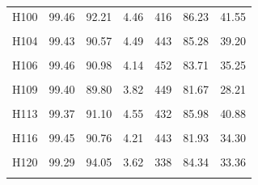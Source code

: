 \documentclass[
  a4paper,
  titlepage]{article}
\begin{document}
\begin{longtable}[t]{lllllll}
H100 & 99.46 & 92.21 & 4.46 & 416 & 86.23 & 41.55\\
 
\cellcolor{gray!6}{H102} & \cellcolor{gray!6}{99.46} & \cellcolor{gray!6}{91.46} & \cellcolor{gray!6}{4.29} & \cellcolor{gray!6}{416} & \cellcolor{gray!6}{85.17} & \cellcolor{gray!6}{37.41}\\
 
H104 & 99.43 & 90.57 & 4.49 & 443 & 85.28 & 39.20\\
 
\cellcolor{gray!6}{H105} & \cellcolor{gray!6}{99.44} & \cellcolor{gray!6}{91.18} & \cellcolor{gray!6}{3.50} & \cellcolor{gray!6}{406} & \cellcolor{gray!6}{78.62} & \cellcolor{gray!6}{24.15}\\
 
H106 & 99.46 & 90.98 & 4.14 & 452 & 83.71 & 35.25\\
 
\cellcolor{gray!6}{H108} & \cellcolor{gray!6}{99.43} & \cellcolor{gray!6}{90.42} & \cellcolor{gray!6}{3.71} & \cellcolor{gray!6}{456} & \cellcolor{gray!6}{82.79} & \cellcolor{gray!6}{29.65}\\
 
H109 & 99.40 & 89.80 & 3.82 & 449 & 81.67 & 28.21\\
 
\cellcolor{gray!6}{H112} & \cellcolor{gray!6}{99.42} & \cellcolor{gray!6}{90.42} & \cellcolor{gray!6}{5.23} & \cellcolor{gray!6}{439} & \cellcolor{gray!6}{86.03} & \cellcolor{gray!6}{45.88}\\
 
H113 & 99.37 & 91.10 & 4.55 & 432 & 85.98 & 40.88\\
 
\cellcolor{gray!6}{H115} & \cellcolor{gray!6}{99.47} & \cellcolor{gray!6}{92.08} & \cellcolor{gray!6}{4.90} & \cellcolor{gray!6}{411} & \cellcolor{gray!6}{88.91} & \cellcolor{gray!6}{48.26}\\
 
H116 & 99.45 & 90.76 & 4.21 & 443 & 81.93 & 34.30\\
 
\cellcolor{gray!6}{H117} & \cellcolor{gray!6}{99.46} & \cellcolor{gray!6}{92.16} & \cellcolor{gray!6}{4.52} & \cellcolor{gray!6}{427} & \cellcolor{gray!6}{85.77} & \cellcolor{gray!6}{41.57}\\
 
H120 & 99.29 & 94.05 & 3.62 & 338 & 84.34 & 33.36\\
 
\cellcolor{gray!6}{H121} & \cellcolor{gray!6}{99.41} & \cellcolor{gray!6}{89.80} & \cellcolor{gray!6}{4.02} & \cellcolor{gray!6}{439} & \cellcolor{gray!6}{82.46} & \cellcolor{gray!6}{30.74}\\
 

\end{longtable}
\end{document}
